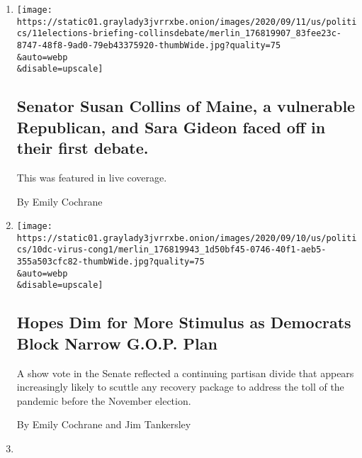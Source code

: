 \begin{enumerate}
\def\labelenumi{\arabic{enumi}.}
\item
  \href{/live/2020/09/11/us/trump-vs-biden/senator-susan-collins-of-maine-a-vulnerable-republican-and-sara-gideon-faced-off-in-their-first-debate}{}

  \texttt{[image: https://static01.graylady3jvrrxbe.onion/images/2020/09/11/us/politics/11elections-briefing-collinsdebate/merlin\_176819907\_83fee23c-8747-48f8-9ad0-79eb43375920-thumbWide.jpg?quality=75\\\&auto=webp\\\&disable=upscale]}

  \hypertarget{senator-susan-collins-of-maine-a-vulnerable-republican-and-sara-gideon-faced-off-in-their-first-debate}{%
  \subsection{Senator Susan Collins of Maine, a vulnerable Republican,
  and Sara Gideon faced off in their first
  debate.}\label{senator-susan-collins-of-maine-a-vulnerable-republican-and-sara-gideon-faced-off-in-their-first-debate}}

  This was featured in live coverage.

  By Emily Cochrane
\item
  \href{/2020/09/10/us/politics/second-stimulus-check.html}{}

  \texttt{[image: https://static01.graylady3jvrrxbe.onion/images/2020/09/10/us/politics/10dc-virus-cong1/merlin\_176819943\_1d50bf45-0746-40f1-aeb5-355a503cfc82-thumbWide.jpg?quality=75\\\&auto=webp\\\&disable=upscale]}

  \hypertarget{hopes-dim-for-more-stimulus-as-democrats-block-narrow-gop-plan}{%
  \subsection{Hopes Dim for More Stimulus as Democrats Block Narrow
  G.O.P.
  Plan}\label{hopes-dim-for-more-stimulus-as-democrats-block-narrow-gop-plan}}

  A show vote in the Senate reflected a continuing partisan divide that
  appears increasingly likely to scuttle any recovery package to address
  the toll of the pandemic before the November election.

  By Emily Cochrane and Jim Tankersley
\item
  \href{/live/2020/09/10/us/trump-vs-biden/the-scaled-back-republican-stimulus-plan-fails-in-the-senate-darkening-prospects-for-a-deal-before-the-election}{}


\end{enumerate}
